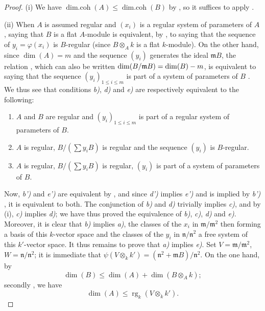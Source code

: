 \begin{proof}
(i) We have $\operatorname{dim.coh}(A)\leq\operatorname{dim.coh}(B)$ by , so it suffices to apply .

(ii) When $A$ is assumed regular and $(x_i)$ is a regular system of parameters of $A$, saying that $B$ is a flat $A$-module is equivalent, by , to saying that the sequence of $y_i=\varphi(x_i)$ is $B$-regular (since $B\otimes_A k$ is a flat $k$-module).
On the other hand, since $\dim(A)=m$ and the sequence $(y_i)$ generates the ideal $\mathfrak{m}B$, the relation , which can also be written $\dim(B/\mathfrak{m}B)=\dim(B)- m$, is equivalent to saying that the sequence $(y_i)_{1\leq i\leq m}$ is part of a system of parameters of $B$ .
We thus see that conditions \emph{b)}, \emph{d)} and \emph{e)} are respectively equivalent to the following:
\begin{enumerate}
  \item[{\textit{b')}}] $A$ and $B$ are regular and $(y_i)_{1\leq i\leq m}$ is part of a regular system of parameters of $B$.
  \item[{\textit{d')}}] $A$ is regular, $B/(\sum y_i B)$ is regular and the sequence $(y_i)$ is $B$-regular.
  \item[{\textit{e')}}] $A$ is regular, $B/(\sum y_i B)$ is regular, $(y_i)$ is part of a system of parameters of $B$.
\end{enumerate}
Now, \emph{b')} and \emph{e')} are equivalent by , and since \emph{d')} implies \emph{e')} and is implied by \emph{b')} , it is equivalent to both.
The conjunction of \emph{b)} and \emph{d)} trivially implies \emph{c)}, and by (i), \emph{c)} implies \emph{d)};
we have thus proved the equivalence of \emph{b)}, \emph{c)}, \emph{d)} and \emph{e)}.
Moreover, it is clear that \emph{b)} implies \emph{a)}, the classes of the $x_i$ in $\mathfrak{m}/\mathfrak{m}^2$ then forming a basis of this $k$-vector space and the classes of the $y_i$ in $\mathfrak{n}/\mathfrak{n}^2$ a free system of this $k'$-vector space.
It thus remains to prove that \emph{a)} implies \emph{e)}.
Set $V=\mathfrak{m}/\mathfrak{m}^2$, $W=\mathfrak{n}/\mathfrak{n}^2$;
it is immediate that $\psi(V\otimes_k k')=(\mathfrak{n}^2+\mathfrak{m}B)/\mathfrak{n}^2$.
On the one hand, by 
\[
\label{0.17.3.3.3}
  \dim(B)\leq\dim(A)+\dim(B\otimes_A k);
  \tag{17.3.3.3}
\]
secondly , we have
\[
\label{0.17.3.3.4}
  \dim(A)\leq\operatorname{rg}_k(V\otimes_k k').
\]
\end{proof}
